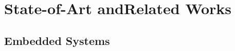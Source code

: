 \section{State-of-Art andRelated Works}
\label{sec:related_work}

\subsection{Embedded Systems}
\cite{Mansour2023}
